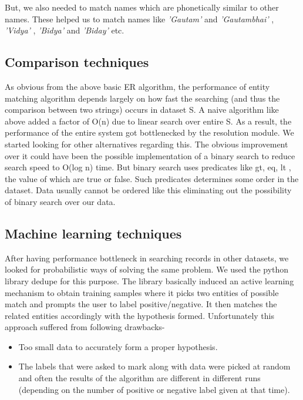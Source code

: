         But, we also needed to match names which are phonetically similar to other names. These helped us to match names like \textit{ 'Gautam' } and \textit{ 'Gautambhai' }, \textit{ 'Vidya' }, \textit{ 'Bidya' } and \textit{ 'Biday' } etc.

\subsection{Comparison techniques}
        
        As obvious from the above basic ER algorithm, the performance of entity matching algorithm depends largely on how fast the searching (and thus the comparison between two strings) occurs in dataset S. A naive algorithm like above added a factor of O(n) due to linear search over entire S. As a result, the performance of the entire system got bottlenecked by the resolution module. We started looking for other alternatives regarding this. The obvious improvement over it could have been the possible implementation of a binary search to reduce search speed to O(log n) time. But binary search uses predicates like gt, eq, lt , the value of which are true or false. Such predicates determines some order in the dataset. Data usually cannot be ordered like this eliminating out the possibility of binary search over our data.
        

\subsection{Machine learning techniques}

        After having performance bottleneck in searching records in other datasets, we looked for probabilistic ways of solving the same problem. We used the python library dedupe \cite{dedupe} for this purpose. The library basically induced an active learning mechanism to obtain training samples where it picks two entities of possible match and prompts the user to label positive/negative. It then matches the related entities accordingly with the hypothesis formed. Unfortunately this approach suffered from following drawbacks-
        \begin{itemize}
        \item Too small data to accurately form a proper hypothesis. 
        \item The labels that were asked to mark along with data were picked at random and often the results of the algorithm are different in different runs (depending on the number of positive or negative label given at that time).
        \end{itemize}

